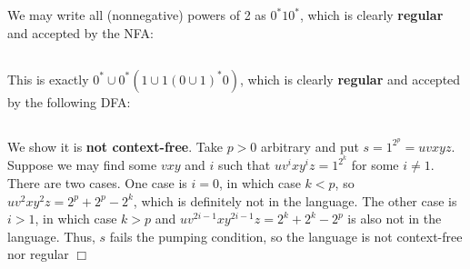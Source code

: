 \documentclass{article}
\begin{document}
\section{}
\subsection{}
We may write all (nonnegative) powers of 2 as $0^*10^*$, which is clearly \textbf{regular} and accepted by the NFA:


\subsection{}
This is exactly $0^* \cup 0^*(1 \cup 1(0\cup1)^*0)$, which is clearly \textbf{regular} and accepted by the following DFA:


\subsection{}
We show it is \textbf{not context-free}. Take $p > 0$ arbitrary and put $s = 1^{2^p} = uvxyz$. Suppose we may find some $vxy$ and $i$ such that $uv^ixy^iz = 1^{2^k}$ for some $i \neq 1$. There are two cases. One case is $i = 0$, in which case $k < p$, so $uv^2xy^2z = 2^{p} + 2^{p} - 2^{k}$, which is definitely not in the language. The other case is $i > 1$, in which case $k > p$ and $uv^{2i-1}xy^{2i-1}z = 2^{k} + 2^{k} - 2^{p}$ is also not in the language. Thus, $s$ fails the pumping condition, so the language is not context-free nor regular $\Box$
\end{document}

